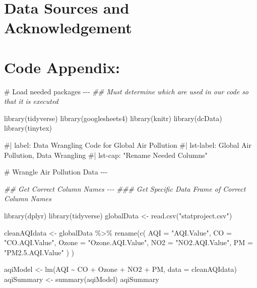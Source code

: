 \documentclass[
  letterpaper,
  DIV=11,
  numbers=noendperiod]{scrartcl}
\newenvironment{Shaded}{\begin{snugshade}}{\end{snugshade}}
\newcommand{\AttributeTok}[1]{\textcolor[rgb]{0.40,0.45,0.13}{#1}}
\newcommand{\CommentTok}[1]{\textcolor[rgb]{0.37,0.37,0.37}{#1}}
\newcommand{\DocumentationTok}[1]{\textcolor[rgb]{0.37,0.37,0.37}{\textit{#1}}}
\newcommand{\FunctionTok}[1]{\textcolor[rgb]{0.28,0.35,0.67}{#1}}
\newcommand{\NormalTok}[1]{\textcolor[rgb]{0.00,0.23,0.31}{#1}}
\newcommand{\OtherTok}[1]{\textcolor[rgb]{0.00,0.23,0.31}{#1}}
\newcommand{\SpecialCharTok}[1]{\textcolor[rgb]{0.37,0.37,0.37}{#1}}
\newcommand{\StringTok}[1]{\textcolor[rgb]{0.13,0.47,0.30}{#1}}
\begin{document}
\section{Data Sources and
Acknowledgement}\label{data-sources-and-acknowledgement}

\section{Code Appendix:}\label{code-appendix}

\begin{Shaded}
\begin{Highlighting}[]
\CommentTok{\# Load needed packages {-}{-}{-}}
\DocumentationTok{\#\# Must determine which are used in our code so that it is executed}


\FunctionTok{library}\NormalTok{(tidyverse)}
\FunctionTok{library}\NormalTok{(googlesheets4)}
\FunctionTok{library}\NormalTok{(knitr)}
\FunctionTok{library}\NormalTok{(dcData)}
\FunctionTok{library}\NormalTok{(tinytex)}

\CommentTok{\#| label: Data Wrangling Code for Global Air Pollution}
\CommentTok{\#| lst{-}label: Global Air Pollution, Data Wrangling}
\CommentTok{\#| lst{-}cap: "Rename Needed Columns"}


\CommentTok{\# Wrangle Air Pollution Data {-}{-}{-}}

\DocumentationTok{\#\# Get Correct Column Names {-}{-}{-}}
\DocumentationTok{\#\#\# Get Specific Data Frame of Correct Column Names}

\FunctionTok{library}\NormalTok{(dplyr)}
\FunctionTok{library}\NormalTok{(tidyverse)}
\NormalTok{globalData }\OtherTok{\textless{}{-}} \FunctionTok{read.csv}\NormalTok{(}\StringTok{"statproject.csv"}\NormalTok{)}

\NormalTok{cleanAQIdata }\OtherTok{\textless{}{-}}\NormalTok{ globalData }\SpecialCharTok{\%\textgreater{}\%}
  \FunctionTok{rename}\NormalTok{(}\FunctionTok{c}\NormalTok{(}
    \AttributeTok{AQI =} \StringTok{"AQI.Value"}\NormalTok{,}
    \AttributeTok{CO =} \StringTok{"CO.AQI.Value"}\NormalTok{,}
    \AttributeTok{Ozone =} \StringTok{"Ozone.AQI.Value"}\NormalTok{,}
    \AttributeTok{NO2 =} \StringTok{"NO2.AQI.Value"}\NormalTok{,}
    \AttributeTok{PM =} \StringTok{"PM2.5.AQI.Value"}
\NormalTok{    )}
\NormalTok{    )}

\NormalTok{aqiModel }\OtherTok{\textless{}{-}} \FunctionTok{lm}\NormalTok{(AQI }\SpecialCharTok{\textasciitilde{}}\NormalTok{ CO }\SpecialCharTok{+}\NormalTok{ Ozone }\SpecialCharTok{+}\NormalTok{ NO2 }\SpecialCharTok{+}\NormalTok{ PM, }\AttributeTok{data =}\NormalTok{ cleanAQIdata)}
\NormalTok{aqiSummary }\OtherTok{\textless{}{-}} \FunctionTok{summary}\NormalTok{(aqiModel)}
\NormalTok{aqiSummary}


\end{Highlighting}
\end{Shaded}
\end{document}
